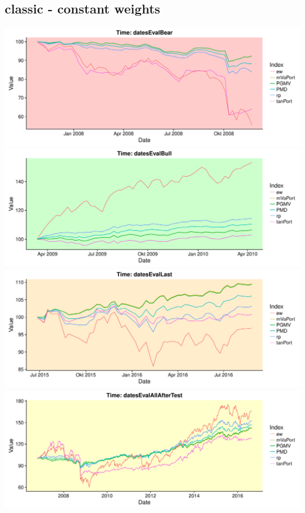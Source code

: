 \documentclass{scrbook}
\begin{document}
\subsection{classic - constant weights}
\includegraphics[width=\textwidth]{Performance-Classic-datesEvalBear.pdf}
\includegraphics[width=\textwidth]{Performance-Classic-datesEvalBull.pdf}
\includegraphics[width=\textwidth]{Performance-Classic-datesEvalLast.pdf}
\includegraphics[width=\textwidth]{Performance-Classic-datesEvalAllAfterTest.pdf}
\end{document}
